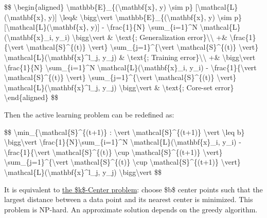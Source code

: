\$\$ \textbackslash begin\{aligned\} \textbackslash mathbb\{E\}\_\{(\textbackslash mathbf\{x\}, y) \textbackslash sim p\} {[}\textbackslash mathcal\{L\}(\textbackslash mathbf\{x\}, y){]} \textbackslash leq\& \textbackslash bigg\textbackslash vert \textbackslash mathbb\{E\}\_\{(\textbackslash mathbf\{x\}, y) \textbackslash sim p\} {[}\textbackslash mathcal\{L\}(\textbackslash mathbf\{x\}, y){]} - \textbackslash frac\{1\}\{N\} \textbackslash sum\_\{i=1\}\^{}N \textbackslash mathcal\{L\}(\textbackslash mathbf\{x\}\_i, y\_i) \textbackslash bigg\textbackslash vert \& \textbackslash text\{; Generalization error\}\textbackslash\textbackslash{} +\& \textbackslash frac\{1\}\{\textbackslash vert \textbackslash mathcal\{S\}\^{}\{(t)\} \textbackslash vert\} \textbackslash sum\_\{j=1\}\^{}\{\textbackslash vert \textbackslash mathcal\{S\}\^{}\{(t)\} \textbackslash vert\} \textbackslash mathcal\{L\}(\textbackslash mathbf\{x\}\^{}l\_j, y\_j) \& \textbackslash text\{; Training error\}\textbackslash\textbackslash{} +\& \textbackslash bigg\textbackslash vert \textbackslash frac\{1\}\{N\} \textbackslash sum\_\{i=1\}\^{}N \textbackslash mathcal\{L\}(\textbackslash mathbf\{x\}\_i, y\_i) - \textbackslash frac\{1\}\{\textbackslash vert \textbackslash mathcal\{S\}\^{}\{(t)\} \textbackslash vert\} \textbackslash sum\_\{j=1\}\^{}\{\textbackslash vert \textbackslash mathcal\{S\}\^{}\{(t)\} \textbackslash vert\} \textbackslash mathcal\{L\}(\textbackslash mathbf\{x\}\^{}l\_j, y\_j) \textbackslash bigg\textbackslash vert \& \textbackslash text\{; Core-set error\} \textbackslash end\{aligned\} \$\$

Then the active learning problem can be redefined as:

\$\$ \textbackslash min\_\{\textbackslash mathcal\{S\}\^{}\{(t+1)\} : \textbackslash vert \textbackslash mathcal\{S\}\^{}\{(t+1)\} \textbackslash vert \textbackslash leq b\} \textbackslash bigg\textbackslash vert \textbackslash frac\{1\}\{N\}\textbackslash sum\_\{i=1\}\^{}N \textbackslash mathcal\{L\}(\textbackslash mathbf\{x\}\_i, y\_i) - \textbackslash frac\{1\}\{\textbackslash vert \textbackslash mathcal\{S\}\^{}\{(t)\} \textbackslash cup \textbackslash mathcal\{S\}\^{}\{(t+1)\} \textbackslash vert\} \textbackslash sum\_\{j=1\}\^{}\{\textbackslash vert \textbackslash mathcal\{S\}\^{}\{(t)\} \textbackslash cup \textbackslash mathcal\{S\}\^{}\{(t+1)\} \textbackslash vert\} \textbackslash mathcal\{L\}(\textbackslash mathbf\{x\}\^{}l\_j, y\_j) \textbackslash bigg\textbackslash vert \$\$

It is equivalent to \href{https://en.wikipedia.org/wiki/Metric_k-center}{the \$k\$-Center problem}: choose \$b\$ center points such that the largest distance between a data point and its nearest center is minimized. This problem is NP-hard. An approximate solution depends on the greedy algorithm.

